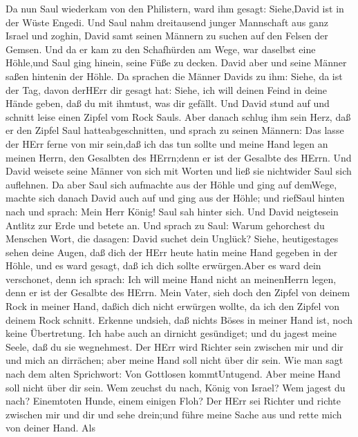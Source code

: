  Da nun Saul wiederkam von den Philistern, ward ihm gesagt:
Siehe,David ist in der Wüste Engedi.  Und Saul nahm
dreitausend junger Mannschaft aus ganz Israel und zoghin, David samt
seinen Männern zu suchen auf den Felsen der Gemsen.  Und da
er kam zu den Schafhürden am Wege, war daselbst eine Höhle,und Saul ging
hinein, seine Füße zu decken. David aber und seine Männer saßen hintenin
der Höhle.  Da sprachen die Männer Davids zu ihm: Siehe, da
ist der Tag, davon derHErr dir gesagt hat: Siehe, ich will deinen Feind
in deine Hände geben, daß du mit ihmtust, was dir gefällt. Und David
stund auf und schnitt leise einen Zipfel vom Rock Sauls. 
Aber danach schlug ihm sein Herz, daß er den Zipfel Saul
hatteabgeschnitten,  und sprach zu seinen Männern: Das lasse
der HErr ferne von mir sein,daß ich das tun sollte und meine Hand legen
an meinen Herrn, den Gesalbten des HErrn;denn er ist der Gesalbte des
HErrn.  Und David weisete seine Männer von sich mit Worten
und ließ sie nichtwider Saul sich auflehnen. Da aber Saul sich aufmachte
aus der Höhle und ging auf demWege,  machte sich danach
David auch auf und ging aus der Höhle; und riefSaul hinten nach und
sprach: Mein Herr König! Saul sah hinter sich. Und David neigtesein
Antlitz zur Erde und betete an.  Und sprach zu Saul: Warum
gehorchest du Menschen Wort, die dasagen: David suchet dein Unglück?
 Siehe, heutigestages sehen deine Augen, daß dich der HErr
heute hatin meine Hand gegeben in der Höhle, und es ward gesagt, daß ich
dich sollte erwürgen.Aber es ward dein verschonet, denn ich sprach: Ich
will meine Hand nicht an meinenHerrn legen, denn er ist der Gesalbte des
HErrn.  Mein Vater, sieh doch den Zipfel von deinem Rock in
meiner Hand, daßich dich nicht erwürgen wollte, da ich den Zipfel von
deinem Rock schnitt. Erkenne undsieh, daß nichts Böses in meiner Hand
ist, noch keine Übertretung. Ich habe auch an dirnicht gesündiget; und
du jagest meine Seele, daß du sie wegnehmest.  Der HErr
wird Richter sein zwischen mir und dir und mich an dirrächen; aber meine
Hand soll nicht über dir sein.  Wie man sagt nach dem alten
Sprichwort: Von Gottlosen kommtUntugend. Aber meine Hand soll nicht über
dir sein.  Wem zeuchst du nach, König von Israel? Wem
jagest du nach? Einemtoten Hunde, einem einigen Floh?  Der
HErr sei Richter und richte zwischen mir und dir und sehe drein;und
führe meine Sache aus und rette mich von deiner Hand.  Als
